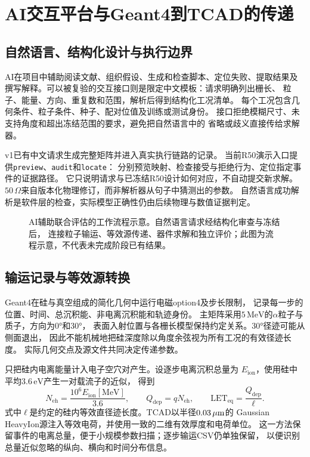 \section{AI交互平台与Geant4到TCAD的传递}
\label{cr:platform}
\subsection{自然语言、结构化设计与执行边界}
AI在项目中辅助阅读文献、组织假设、生成和检查脚本、定位失败、提取结果及
撰写解释。可以被复验的交互接口则是限定中文模板：请求明确列出栅长、
粒子、能量、方向、重复数和范围，解析后得到结构化工况清单。
每个工况包含几何条件、粒子条件、种子、配对位值及训练或测试身份。
接口拒绝模糊尺寸、未支持角度和超出冻结范围的要求，避免把自然语言中的
省略或歧义直接传给求解器。

v1已有中文请求生成完整矩阵并进入真实执行链路的记录。
当前R50演示入口提供\texttt{preview}、\texttt{audit}和\texttt{locate}：
分别预览映射、检查接受与拒绝行为、定位指定事件的证据路径。
它只说明请求与已冻结R50设计如何对应，不自动提交新求解。
$50\,\Omega$来自版本化物理修订，而非解析器从句子中猜测出的参数。
自然语言成功解析是软件层的检查，实际模型正确性仍由后续物理与数值证据判定。

\begin{figure}[htbp]
\centering

\caption{AI辅助联合评估的工作流程示意。自然语言请求经结构化审查与冻结后，
连接粒子输运、等效源传递、器件求解和独立评价；此图为流程示意，不代表未完成阶段已有结果。}
\label{cr:workflow}
\end{figure}

\subsection{输运记录与等效源转换}
Geant4在硅与真空组成的简化几何中运行电磁option4及步长限制，
记录每一步的位置、时间、总沉积能、非电离沉积能和轨迹身份。
主矩阵采用$5\,\mathrm{MeV}$的$\alpha$粒子与质子，方向为0°和30°，
表面入射位置与各栅长模型保持约定关系。30°径迹可能从侧面退出，
因此不能机械地把硅深度除以角度余弦视为所有工况的有效径迹长度。
实际几何交点及源文件共同决定传递参数。

只把硅内电离能量计入电子空穴对产生。设逐步电离沉积总量为
$E_{\mathrm{ion}}$，使用硅中平均$3.6\,\mathrm{eV}$产生一对载流子的近似，
得到
\begin{equation}
N_{\mathrm{eh}}=\frac{10^6E_{\mathrm{ion}}[\mathrm{MeV}]}{3.6},\qquad
Q_{\mathrm{dep}}=qN_{\mathrm{eh}},\qquad
\mathrm{LET}_{\mathrm{eq}}=\frac{Q_{\mathrm{dep}}}{\ell}.
\label{cr:transfer}
\end{equation}
式中$\ell$是约定的硅内等效直径迹长度。TCAD以半径$0.03\,\mu\mathrm{m}$的
Gaussian HeavyIon源注入等效电荷，并使用一致的二维有效厚度和电荷单位。
这一方法保留事件的电离总量，便于小规模参数扫描；逐步输运CSV仍单独保留，
以便识别总量近似忽略的纵向、横向和时间分布信息。


